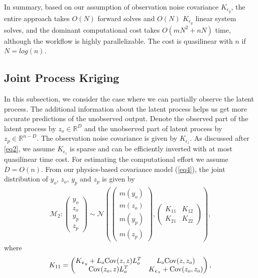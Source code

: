 \documentclass[article,ij4uq]{ij4uq}              %
\begin{document}
\par In summary, based on our assumption of observation noise covariance $K_{\epsilon_{y}}$, the entire approach takes $O(N)$ forward solves and $O(N)$ $K_{\epsilon_{y}}$ linear system solves, and the dominant computational cost takes $O(mN^{2}+nN)$ time, although the workflow is highly parallelizable. The cost is quasilinear with $n$ if $N=log(n)$. 

\subsection{Joint Process Kriging}\label{sec:jpf}
\par In this subsection, we consider the case where we can partially observe the latent process. The additional information about the latent process helps us get more accurate predictions of the unobserved output. Denote the observed part of the latent process by $z_{o}\in\mathbb{R}^{D}$ and the unobserved part of latent process by $z_{p}\in\mathbb{R}^{n-D}$. The observation noise covariance is given by $K_{\epsilon_{z}}$. As discussed after 
\eqref{eq2}, we assume $K_{\epsilon_{z}}$ is sparse and can be efficiently inverted with at most quasilinear time cost. For estimating the computational effort  we assume $D=O(n)$. From our physics-based covariance model (\ref{eq4}), the joint distribution of $y_{o}$, $z_{o}$, $y_{p}$ and $z_{p}$ is given by
\begin{align}
    \mathcal{M}_{2}:\begin{pmatrix}y_{o}\\z_{o}\\y_{p}\\z_{p}\end{pmatrix}\sim\mathcal{N}\left(\begin{pmatrix}m(y_{o})\\m(z_{o})\\m(y_{p})\\m(z_{p})\end{pmatrix},\begin{pmatrix}K_{11}&K_{12}\\K_{21}&K_{22}\end{pmatrix}\right),\label{eq23}
\end{align}
where
\begin{align}
    K_{11}=\begin{pmatrix}K_{\epsilon_{y}}+L_{o}{\rm{Cov}}(z,z)L_{o}^{T} & L_{o}{\rm{Cov}}(z,z_{o})\\{\rm{Cov}}(z_{o},z)L_{o}^{T} & K_{\epsilon_{z}}+{\rm{Cov}}(z_{o},z_{o})\end{pmatrix},\label{eq24}
\end{align}
\end{document}
